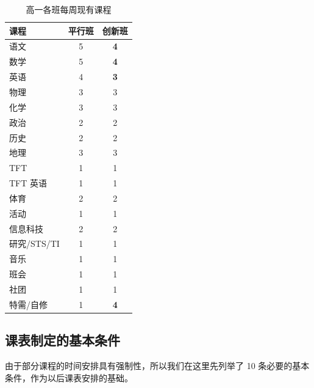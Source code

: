 \documentclass[a4paper]{article}
\begin{document}
  \begin{table}[H]
  \centering
  \begin{tabular}{lcc}
  \toprule
  \bf 课程 & \bf 平行班 & \bf 创新班\\
  \midrule
  语文 & 5 & \bf 4 \\
  数学 & 5 & \bf 4 \\
  英语 & 4 & \bf 3 \\
  物理 & 3 & 3 \\
  化学 & 3 & 3 \\
  政治 & 2 & 2 \\
  历史 & 2 & 2 \\
  地理 & 3 & 3 \\
  TFT & 1 & 1 \\
  TFT 英语 & 1 & 1 \\
  体育 & 2 & 2 \\
  活动 & 1 & 1 \\
  信息科技 & 2 & 2 \\
  研究/STS/TI & 1 & 1 \\
  音乐 & 1 & 1 \\
  班会 & 1 & 1 \\
  社团 & 1 & 1 \\
  特需/自修 & 1 & \bf 4 \\
  \bottomrule
  \end{tabular}
  \caption{高一各班每周现有课程}
  \end{table}

 \subsection{课表制定的基本条件}

  由于部分课程的时间安排具有强制性，所以我们在这里先列举了 10 条必要的基本条件，作为以后课表安排的基础。
\end{document}
